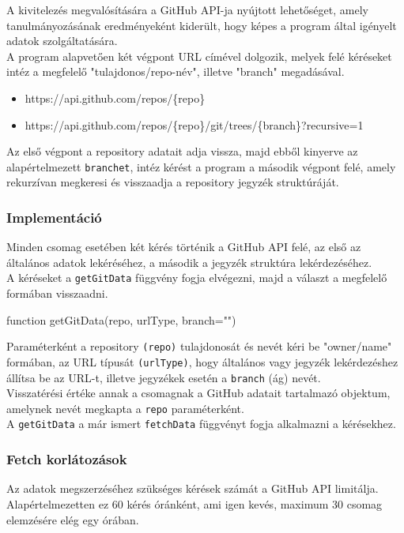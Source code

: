 A kivitelezés megvalósítására a GitHub API-ja nyújtott lehetőséget, amely tanulmányozásának eredményeként kiderült, hogy képes a program által igényelt adatok szolgáltatására.\\

A program alapvetően két végpont URL címével dolgozik, melyek felé kéréseket intéz a megfelelő "tulajdonos/repo-név", illetve "branch" megadásával.
\begin{itemize}
	\item https://api.github.com/repos/\{repo\}
	\item https://api.github.com/repos/\{repo\}/git/trees/\{branch\}?recursive=1
\end{itemize}

Az első végpont a repository adatait adja vissza, majd ebből kinyerve az alapértelmezett \texttt{branchet}, intéz kérést a program a második végpont felé, amely rekurzívan megkeresi és visszaadja a repository jegyzék struktúráját.

\subsubsection{Implementáció}
Minden csomag esetében két kérés történik a GitHub API felé, az első az általános adatok lekéréséhez, a második a jegyzék struktúra lekérdezéséhez.\\

A kéréseket a \texttt{getGitData} függvény fogja elvégezni, majd a választ a megfelelő formában visszaadni.

\begin{js}
function getGitData(repo, urlType, branch="")
\end{js}
Paraméterként a repository \texttt{(repo)} tulajdonosát és nevét kéri be "owner/name" formában, az URL típusát \texttt{(urlType)}, hogy általános vagy jegyzék lekérdezéshez állítsa be az URL-t, illetve jegyzékek esetén a \texttt{branch} (ág) nevét.\\

\noindent Visszatérési értéke annak a csomagnak a GitHub adatait tartalmazó objektum, amelynek nevét megkapta a \texttt{repo} paraméterként.\\

\noindent A \texttt{getGitData} a már ismert \texttt{fetchData} függvényt fogja alkalmazni a kérésekhez.

\subsubsection{Fetch korlátozások}
Az adatok megszerzéséhez szükséges kérések számát a GitHub API limitálja. Alapértelmezetten ez 60 kérés óránként, ami igen kevés, maximum 30 csomag elemzésére elég egy órában.


